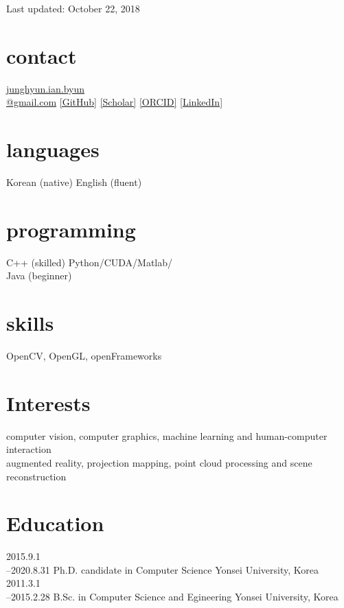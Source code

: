 \documentclass[]{friggeri-cv}
\begin{document}
       {Last updated: October 22, 2018}

\begin{aside}
  \section{contact}
    \href{mailto:junghyun.ian.byun@gmail.com}{junghyun.ian.byun\\@gmail.com}
    \href{https://github.com/IanByun}{[GitHub]}
    \href{https://scholar.google.co.kr/citations?user=JzneZIcAAAAJ}{[Scholar]}
    \href{https://orcid.org/0000-0002-1248-292X}{[ORCID]}
    \href{https://www.linkedin.com/in/junghyun-ian-byun/}{[LinkedIn]}
  \section{languages}
    Korean (native)
    English (fluent)
  \section{programming}
    C++ (skilled)
    Python/CUDA/Matlab/\\Java (beginner)
  \section{skills}
    OpenCV, OpenGL, openFrameworks
\end{aside}


\section{Interests}

computer vision, computer graphics, machine learning and human-computer interaction\\
augmented reality, projection mapping, point cloud processing and scene reconstruction

\section{Education}

\begin{entrylist}
  \entry
    {2015.9.1\\--2020.8.31}
    {Ph.D. {\normalfont candidate in Computer Science}}
    {Yonsei University, Korea}
    {}
  \entry
    {2011.3.1\\--2015.2.28}
    {B.Sc. {\normalfont in Computer Science and Egineering}}
    {Yonsei University, Korea}
    {}
\end{entrylist}
\end{document}
